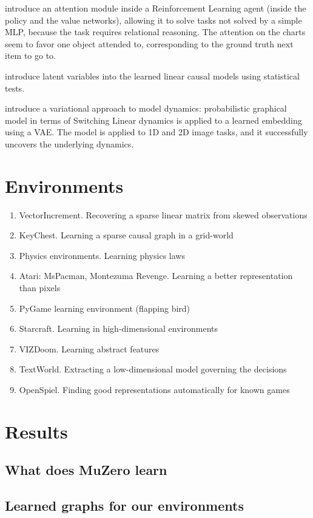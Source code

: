 \documentclass{article}
\begin{document}
\cite{Zambaldi2018} introduce an attention module inside a Reinforcement Learning agent (inside the policy and the value networks), allowing it to solve tasks not solved by a simple MLP, because the task requires relational reasoning. The attention on the charts seem to favor one object attended to, corresponding to the ground truth next item to go to.

\cite{Xie2020} introduce latent variables into the learned linear causal models using statistical tests.

\cite{Johnson2016} introduce a variational approach to model dynamics: probabilistic graphical model in terms of Switching Linear dynamics is applied to a learned embedding using a VAE. The model is applied to 1D and 2D image tasks, and it successfully uncovers the underlying dynamics.

\section{Environments}
\begin{enumerate}
    \item VectorIncrement. Recovering a sparse linear matrix from skewed observations
    \item KeyChest. Learning a sparse causal graph in a grid-world
    \item Physics environments. Learning physics laws
    \item Atari: MsPacman, Montezuma Revenge. Learning a better representation than pixels
    \item PyGame learning environment (flapping bird)
    \item Starcraft. Learning in high-dimensional environments
    \item VIZDoom. Learning abstract features
    \item TextWorld. Extracting a low-dimensional model governing the decisions
    \item OpenSpiel. Finding good representations automatically for known games
\end{enumerate}

\section{Results}
\subsection{What does MuZero learn}
\subsection{Learned graphs for our environments}
\end{document}
